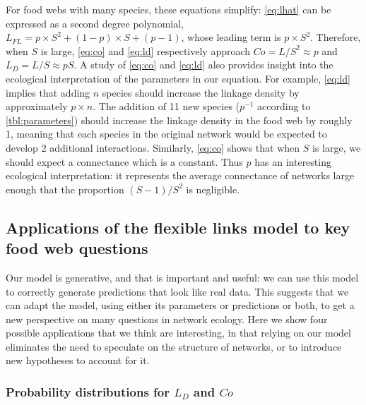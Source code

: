 \documentclass[12pt]{article}
\begin{document}
For food webs with many species, these equations simplify:
\cref{eq:lhat} can be expressed as a second degree polynomial,
\(L_{FL} = p\times S^2 + (1-p)\times S + (p-1)\), whose leading term is
\(p\times S^2\). Therefore, when \(S\) is large, \cref{eq:co} and
\cref{eq:ld} respectively approach \(Co = L/S^2 \approx p\) and
\(L_D = L/S \approx pS\). A study of \cref{eq:co} and \cref{eq:ld} also
provides insight into the ecological interpretation of the parameters in
our equation. For example, \cref{eq:ld} implies that adding \(n\)
species should increase the linkage density by approximately
\(p\times n\). The addition of 11 new species (\(p^{-1}\) according to
\cref{tbl:parameters}) should increase the linkage density in the food
web by roughly 1, meaning that each species in the original network
would be expected to develop 2 additional interactions. Similarly,
\cref{eq:co} shows that when \(S\) is large, we should expect a
connectance which is a constant. Thus \(p\) has an interesting
ecological interpretation: it represents the average connectance of
networks large enough that the proportion \((S-1)/S^{2}\) is negligible.

\hypertarget{applications-of-the-flexible-links-model-to-key-food-web-questions}{%
\subsection{Applications of the flexible links model to key food web
questions}\label{applications-of-the-flexible-links-model-to-key-food-web-questions}}

Our model is generative, and that is important and useful: we can use
this model to correctly generate predictions that look like real data.
This suggests that we can adapt the model, using either its parameters
or predictions or both, to get a new perspective on many questions in
network ecology. Here we show four possible applications that we think
are interesting, in that relying on our model eliminates the need to
speculate on the structure of networks, or to introduce new hypotheses
to account for it.

\hypertarget{probability-distributions-for-l_d-and-co}{%
\subsubsection{\texorpdfstring{Probability distributions for \(L_D\) and
\(Co\)}{Probability distributions for L\_D and Co}}\label{probability-distributions-for-l_d-and-co}}
\end{document}
